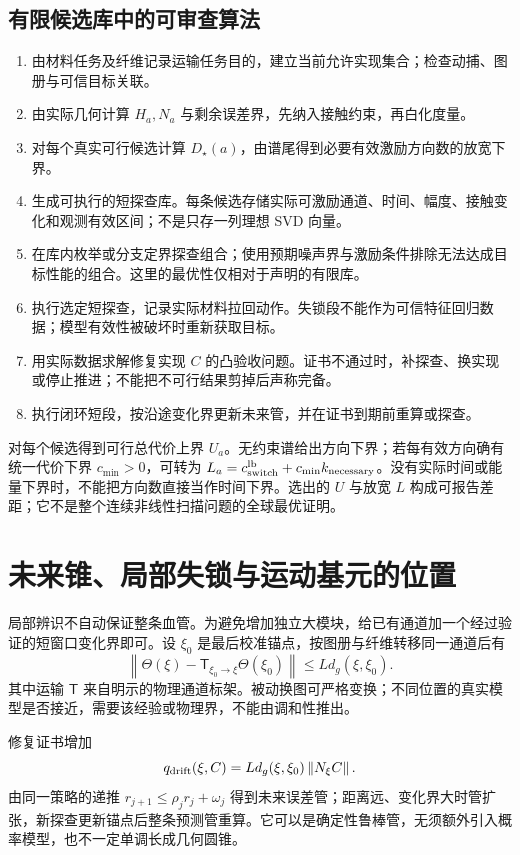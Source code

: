 \documentclass[11pt,a4paper]{article}
\numberwithin{equation}{section}
\theoremstyle{definition}
\newcommand{\norm}[1]{\left\lVert#1\right\rVert}
\begin{document}
\subsection{有限候选库中的可审查算法}
\begin{enumerate}
\item 由材料任务及纤维记录运输任务目的，建立当前允许实现集合；检查动捕、图册与可信目标关联。
\item 由实际几何计算 $H_a,N_a$ 与剩余误差界，先纳入接触约束，再白化度量。
\item 对每个真实可行候选计算 $D_\star(a)$，由谱尾得到必要有效激励方向数的放宽下界。
\item 生成可执行的短探查库。每条候选存储实际可激励通道、时间、幅度、接触变化和观测有效区间；不是只存一列理想 SVD 向量。
\item 在库内枚举或分支定界探查组合；使用预期噪声界与激励条件排除无法达成目标性能的组合。这里的最优性仅相对于声明的有限库。
\item 执行选定短探查，记录实际材料拉回动作。失锁段不能作为可信特征回归数据；模型有效性被破坏时重新获取目标。
\item 用实际数据求解修复实现 $C$ 的凸验收问题。证书不通过时，补探查、换实现或停止推进；不能把不可行结果剪掉后声称完备。
\item 执行闭环短段，按沿途变化界更新未来管，并在证书到期前重算或探查。
\end{enumerate}
对每个候选得到可行总代价上界 $U_a$。无约束谱给出方向下界；若每有效方向确有统一代价下界 $c_{\min}>0$，可转为 $L_a=c_{\rm switch}^{\rm lb}+c_{\min}k_{\rm necessary}$。没有实际时间或能量下界时，不能把方向数直接当作时间下界。选出的 $U$ 与放宽 $L$ 构成可报告差距；它不是整个连续非线性扫描问题的全球最优证明。

\section{未来锥、局部失锁与运动基元的位置}
局部辨识不自动保证整条血管。为避免增加独立大模块，给已有通道加一个经过验证的短窗口变化界即可。设 $\xi_0$ 是最后校准锚点，按图册与纤维转移同一通道后有
\begin{equation}
 \norm{\Theta(\xi)-\mathsf T_{\xi_0\to\xi}\Theta(\xi_0)}
 \le Ld_g(\xi,\xi_0).
\end{equation}
其中运输 $\mathsf T$ 来自明示的物理通道标架。被动换图可严格变换；不同位置的真实模型是否接近，需要该经验或物理界，不能由调和性推出。

修复证书增加
\begin{equation}
 q_{\rm drift}(\xi,C)=Ld_g(\xi,\xi_0)\norm{N_\xi C}.
\end{equation}
由同一策略的递推 $r_{j+1}\le\rho_jr_j+\omega_j$ 得到未来误差管；距离远、变化界大时管扩张，新探查更新锚点后整条预测管重算。它可以是确定性鲁棒管，无须额外引入概率模型，也不一定单调长成几何圆锥。
\end{document}
